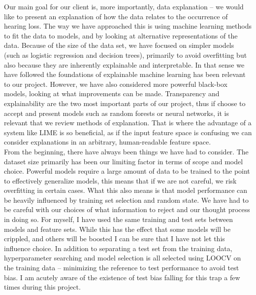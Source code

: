 \documentclass[a4paper]{article}
\begin{document}
Our main goal for our client is, more importantly, data explanation – we would like to present an explanation of how the data relates to the occurrence of hearing loss. The way we have approached this is using machine learning methods to fit the data to models, and by looking at alternative representations of the data. Because of the size of the data set, we have focused on simpler models (such as logistic regression and decision trees), primarily to avoid overfitting but also because they are inherently explainable and interpretable. In that sense we have followed the foundations of explainable machine learning has been relevant to our project. However, we have also considered more powerful black-box models, looking at what improvements can be made. Transparency and explainability are the two most important parts of our project, thus if choose to accept and present models such as random forests or neural networks, it is relevant that we review methods of explanation. That is where the advantage of a system like LIME is so beneficial, as if the input feature space is confusing we  can consider explanations in an arbitrary, human-readable feature space. \\


From the beginning, there have always been things we have had to consider. The dataset size primarily has been our limiting factor in terms of scope and model choice. Powerful models require a large amount of data to be trained to the point to effectively generalize models, this means that if we are not careful, we risk overfitting in certain cases. What this also means is that model performance can be heavily influenced by training set selection and random state. We have had to be careful with our choices of what information to reject and our thought process in doing so. For myself, I have used the same training and test sets between models and feature sets. While this has the effect that some models will be crippled, and others will be boosted I can be sure that I have not let this influence choice. In addition to separating a test set from the training data, hyperparameter searching and model selection is all selected using LOOCV on the training data – minimizing the reference to test performance to avoid test bias. I am acutely aware of the existence of test bias falling for this trap a few times during this project. \\
\end{document}
